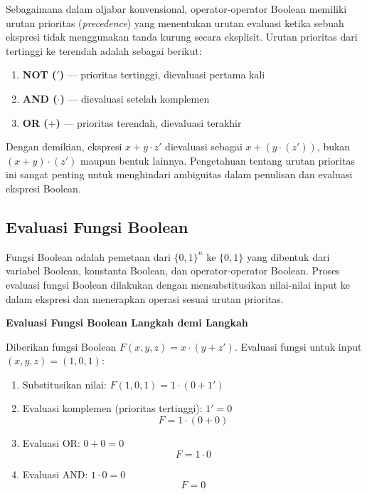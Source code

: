 Sebagaimana dalam aljabar konvensional, operator-operator Boolean memiliki urutan prioritas (\textit{precedence}) yang menentukan urutan evaluasi ketika sebuah ekspresi tidak menggunakan tanda kurung secara eksplisit. Urutan prioritas dari tertinggi ke terendah adalah sebagai berikut:

\begin{enumerate}
  \item \textbf{NOT ($'$)} --- prioritas tertinggi, dievaluasi pertama kali
  \item \textbf{AND ($\cdot$)} --- dievaluasi setelah komplemen
  \item \textbf{OR ($+$)} --- prioritas terendah, dievaluasi terakhir
\end{enumerate}

Dengan demikian, ekspresi $x + y \cdot z'$ dievaluasi sebagai $x + (y \cdot (z'))$, bukan $(x + y) \cdot (z')$ maupun bentuk lainnya. Pengetahuan tentang urutan prioritas ini sangat penting untuk menghindari ambiguitas dalam penulisan dan evaluasi ekspresi Boolean.

\subsection{Evaluasi Fungsi Boolean}

Fungsi Boolean adalah pemetaan dari $\{0,1\}^n$ ke $\{0,1\}$ yang dibentuk dari variabel Boolean, konstanta Boolean, dan operator-operator Boolean. Proses evaluasi fungsi Boolean dilakukan dengan mensubstitusikan nilai-nilai input ke dalam ekspresi dan menerapkan operasi sesuai urutan prioritas.

\begin{contoh}
\textbf{Evaluasi Fungsi Boolean Langkah demi Langkah}

Diberikan fungsi Boolean $F(x,y,z) = x \cdot (y + z')$. Evaluasi fungsi untuk input $(x, y, z) = (1, 0, 1)$:

\begin{enumerate}
    \item Substitusikan nilai: $F(1,0,1) = 1 \cdot (0 + 1')$
    \item Evaluasi komplemen (prioritas tertinggi): $1' = 0$
    \[ F = 1 \cdot (0 + 0) \]
    \item Evaluasi OR: $0 + 0 = 0$
    \[ F = 1 \cdot 0 \]
    \item Evaluasi AND: $1 \cdot 0 = 0$
    \[ F = 0 \]
\end{enumerate}
\end{contoh}

